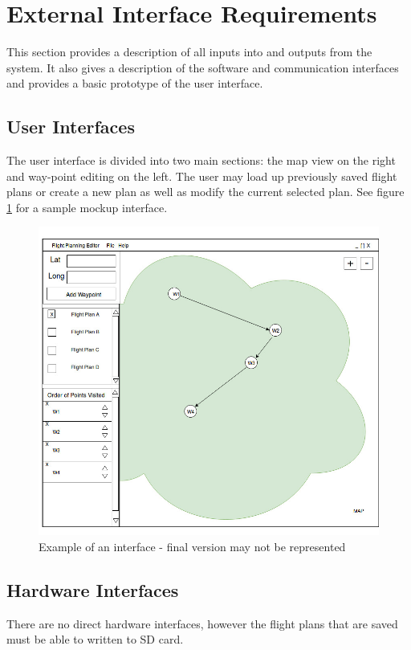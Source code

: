 \documentclass[12pt, letterpaper]{article}
\begin{document}
\section{External Interface Requirements}
  This section provides a description of all inputs into and outputs from the system.
  It also gives a description of the software and communication interfaces and provides a basic prototype of the user interface.
\subsection{User Interfaces}
  The user interface is divided into two main sections: the map view on the right and way-point editing on the left.
  The user may load up previously saved flight plans or create a new plan as well as modify the current selected plan.
  See figure \ref{fig:ui} for a sample mockup interface.
  \begin{figure}[!ht]
    \includegraphics[scale=0.5]{images/FlightPlanning_Interface.jpg}
    \caption{Example of an interface - final version may not be represented}
    \label{fig:ui}
  \end{figure}

  \subsection{Hardware Interfaces}
    There are no direct hardware interfaces, however the flight plans that are saved must be able to written to SD card.
\end{document}
